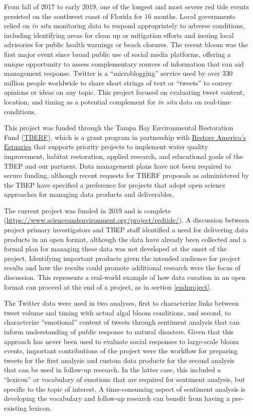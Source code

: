 \documentclass[
]{book}
\begin{document}
From fall of 2017 to early 2019, one of the longest and most severe red tide events persisted on the southwest coast of Florida for 16 months. Local governments relied on \emph{in situ} monitoring data to respond appropriately to adverse conditions, including identifying areas for clean up or mitigation efforts and issuing local advisories for public health warnings or beach closures. The recent bloom was the first major event since broad public use of social media platforms, offering a unique opportunity to assess complementary sources of information that can aid management response. Twitter is a ``microblogging'' service used by over 330 million people worldwide to share short strings of text or ``tweets'' to convey opinions or ideas on any topic. This project focused on evaluating tweet content, location, and timing as a potential complement for \emph{in situ} data on real-time conditions.

This project was funded through the Tampa Bay Environmental Restoration Fund (\href{https://tbep.org/our-work/restoration-research/tberf/}{TBERF}), which is a grant program in partnership with \href{https://estuaries.org/}{Restore America's Estuaries} that supports priority projects to implement water quality improvement, habitat restoration, applied research, and educational goals of the TBEP and our partners. Data management plans have not been required to secure funding, although recent requests for TBERF proposals as administered by the TBEP have specified a preference for projects that adopt open science approaches for managing data products and deliverables.

The current project was funded in 2019 and is complete (\url{https://www.scienceandenvironment.org/project/redtide/}). A discussion between project primary investigators and TBEP staff identified a need for delivering data products in an open format, although the data have already been collected and a formal plan for managing these data was not developed at the onset of the project. Identifying important products given the intended audience for project results and how the results could promote additional research were the focus of discussion. This represents a real-world example of how data curation in an open format can proceed at the end of a project, as in section \ref{endproject}.

The Twitter data were used in two analyses, first to characterize links between tweet volume and timing with actual algal bloom conditions, and second, to characterize ``emotional'' content of tweets through sentiment analysis that can inform understanding of public response to natural disasters. Given that this approach has never been used to evaluate social responses to large-scale bloom events, important contributions of the project were the workflow for preparing tweets for the first analysis and custom data products for the second analysis that can be used in follow-up research. In the latter case, this included a ``lexicon'' or vocabulary of emotions that are required for sentiment analysis, but specific to the topic of interest. A time-consuming aspect of sentiment analysis is developing the vocabulary and follow-up research can benefit from having a pre-existing lexicon.
\end{document}
